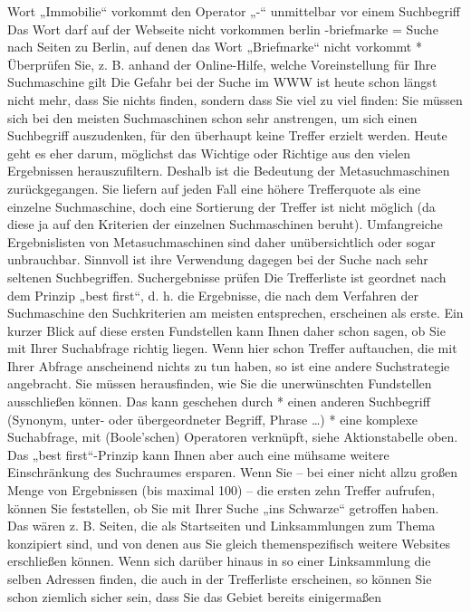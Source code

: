 \documentclass[]{book}
\theoremstyle{definition}
\theoremstyle{definition}
\theoremstyle{definition}
\theoremstyle{remark}
\begin{document}
Wort „Immobilie`` vorkommt den Operator „-`` unmittelbar vor einem
Suchbegriff Das Wort darf auf der Webseite nicht vorkommen berlin
-briefmarke = Suche nach Seiten zu Berlin, auf denen das Wort
„Briefmarke`` nicht vorkommt * Überprüfen Sie, z. B. anhand der
Online-Hilfe, welche Voreinstellung für Ihre Suchmaschine gilt Die
Gefahr bei der Suche im WWW ist heute schon längst nicht mehr, dass Sie
nichts finden, sondern dass Sie viel zu viel finden: Sie müssen sich bei
den meisten Suchmaschinen schon sehr anstrengen, um sich einen
Suchbegriff auszudenken, für den überhaupt keine Treffer erzielt werden.
Heute geht es eher darum, möglichst das Wichtige oder Richtige aus den
vielen Ergebnissen herauszufiltern. Deshalb ist die Bedeutung der
Metasuchmaschinen zurückgegangen. Sie liefern auf jeden Fall eine höhere
Trefferquote als eine einzelne Suchmaschine, doch eine Sortierung der
Treffer ist nicht möglich (da diese ja auf den Kriterien der einzelnen
Suchmaschinen beruht). Umfangreiche Ergebnislisten von Metasuchmaschinen
sind daher unübersichtlich oder sogar unbrauchbar. Sinnvoll ist ihre
Verwendung dagegen bei der Suche nach sehr seltenen Suchbegriffen.
Suchergebnisse prüfen Die Trefferliste ist geordnet nach dem Prinzip
„best first``, d. h. die Ergebnisse, die nach dem Verfahren der
Suchmaschine den Suchkriterien am meisten entsprechen, erscheinen als
erste. Ein kurzer Blick auf diese ersten Fundstellen kann Ihnen daher
schon sagen, ob Sie mit Ihrer Suchabfrage richtig liegen. Wenn hier
schon Treffer auftauchen, die mit Ihrer Abfrage anscheinend nichts zu
tun haben, so ist eine andere Suchstrategie angebracht. Sie müssen
herausfinden, wie Sie die unerwünschten Fundstellen ausschließen können.
Das kann geschehen durch * einen anderen Suchbegriff (Synonym, unter-
oder übergeordneter Begriff, Phrase \ldots{}) * eine komplexe
Suchabfrage, mit (Boole'schen) Operatoren verknüpft, siehe
Aktionstabelle oben. Das „best first``-Prinzip kann Ihnen aber auch eine
mühsame weitere Einschränkung des Suchraumes ersparen. Wenn Sie -- bei
einer nicht allzu großen Menge von Ergebnissen (bis maximal 100) -- die
ersten zehn Treffer aufrufen, können Sie feststellen, ob Sie mit Ihrer
Suche „ins Schwarze`` getroffen haben. Das wären z. B. Seiten, die als
Startseiten und Linksammlungen zum Thema konzipiert sind, und von denen
aus Sie gleich themenspezifisch weitere Websites erschließen können.
Wenn sich darüber hinaus in so einer Linksammlung die selben Adressen
finden, die auch in der Trefferliste erscheinen, so können Sie schon
ziemlich sicher sein, dass Sie das Gebiet bereits einigermaßen
\end{document}
